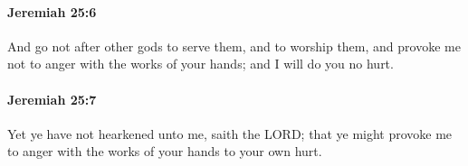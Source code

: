 		\paragraph{Jeremiah 25:6} %
			\label{JEREMIAH-25-6}

			And go not after other gods to serve them, and to worship them, and provoke me not to anger with the works of your hands; and I will do you no hurt.


		\paragraph{Jeremiah 25:7} %
			\label{JEREMIAH-25-7}

			Yet ye have not hearkened unto me, saith the LORD; that ye might provoke me to anger with the works of your hands to your own hurt.


